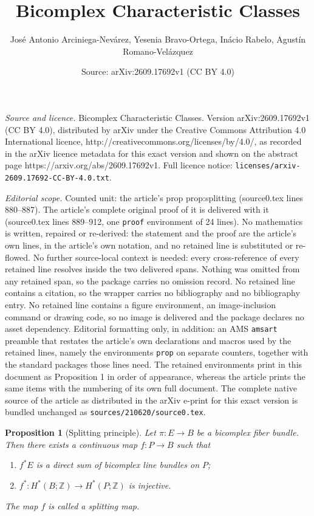 \documentclass[10pt,a4paper]{amsart}
\title{Bicomplex Characteristic Classes}
\author{Jos\'e Antonio Arciniega-Nev\'arez, Yesenia Bravo-Ortega, In\'acio Rabelo, Agust\'in Romano-Vel\'azquez}
\date{Source: arXiv:2609.17692v1 (CC BY 4.0)}
\newtheorem{prop}{Proposition}
\newcommand{\Z}{\mathbb{Z}}
\begin{document}
\maketitle

\noindent\emph{Source and licence.} Bicomplex Characteristic Classes. Version arXiv:2609.17692v1 (CC BY 4.0), distributed by arXiv under the Creative Commons Attribution 4.0 International licence, http://creativecommons.org/licenses/by/4.0/, as recorded in the arXiv licence metadata for this exact version and shown on the abstract page https://arxiv.org/abs/2609.17692v1. Full licence notice: \texttt{licenses/arxiv-2609.17692-CC-BY-4.0.txt}.\par\smallskip

\noindent\textit{Editorial scope.} Counted unit: the article's prop prop:splitting (source0.tex lines 880--887). The article's complete original proof of it is delivered with it (source0.tex lines 889--912, one \texttt{proof} environment of 24 lines). No mathematics is written, repaired or re-derived: the statement and the proof are the article's own lines, in the article's own notation, and no retained line is substituted or re-flowed.  No further source-local context is needed: every cross-reference of every retained line resolves inside the two delivered spans.  Nothing was omitted from any retained span, so the package carries no omission record.  No retained line contains a citation, so the wrapper carries no bibliography and no bibliography entry.  No retained line contains a figure environment, an image-inclusion command or drawing code, so no image is delivered and the package declares no asset dependency.  Editorial formatting only, in addition: an AMS \texttt{amsart} preamble that restates the article's own declarations and macros used by the retained lines, namely the environments \texttt{prop} on separate counters, together with the standard packages those lines need.  The retained environments print in this document as Proposition 1 in order of appearance, whereas the article prints the same items with the numbering of its own full document.  The complete native source of the article as distributed in the arXiv e-print for this exact version is bundled unchanged as \texttt{sources/210620/source0.tex}.
\begin{prop}[Splitting principle]\label{prop:splitting}
    Let $\pi:E \to B$ be a bicomplex fiber bundle. Then there exists a continuous map $f: P \to B$ such that
    \begin{enumerate}
        \item $f^*E$ is a direct sum of bicomplex line bundles on $P$;
        \item $f^*: H^*(B;\Z) \to H^*(P;\Z)$ is injective.
    \end{enumerate}
    The map $f$ is called a \emph{splitting map}.
\end{prop}
\end{document}
